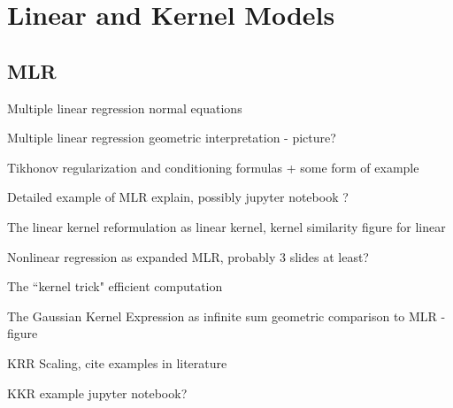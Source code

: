\section{Linear and Kernel Models}
\subsection{MLR}
\begin{frame}{Multiple linear regression}
normal equations
\end{frame}
\begin{frame}{Multiple linear regression}
geometric interpretation - picture?
\end{frame}
\begin{frame}{Tikhonov regularization and conditioning}
formulas + some form of example
\end{frame}
\begin{frame}{Detailed example of MLR}
explain, possibly jupyter notebook ?
\end{frame}
\begin{frame}{The linear kernel}
reformulation as linear kernel, kernel similarity figure for linear
\end{frame}
\begin{frame}{Nonlinear regression}
as expanded MLR, probably 3 slides at least? 
\end{frame}
\begin{frame}{The ``kernel trick"}
efficient computation 
\end{frame}
\begin{frame}{The Gaussian Kernel}
Expression as infinite sum
geometric comparison to MLR - figure 
\end{frame}
\begin{frame}{KRR}
Scaling, cite examples in literature
\end{frame}
\begin{frame}{KKR example}
jupyter notebook?
\end{frame}

